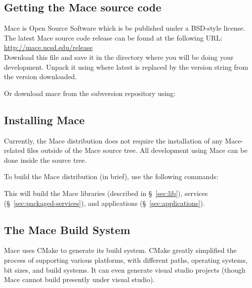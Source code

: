 \subsection{Getting the Mace source code}
\label{sec:downloading}

Mace is Open Source Software which is be published under a BSD-style license.
The latest Mace source code release can be found at the following URL: \\

\href{http://mace.ucsd.edu/release}{http://mace.ucsd.edu/release} \\

Download this file and save it in the directory where you will be
doing your development.  Unpack it using 
where  latest is replaced by the version string
from the version downloaded.

Or download mace from the subversion repository using: \\


\subsection{Installing Mace}
\label{sec:unpacking}

Currently, the Mace distribution does not require the installation of any
Mace-related files outside of the Mace source tree.  All development using Mace
can be done inside the source tree.

To build the Mace distribution (in brief), use the following commands:

\begin{screen}
\end{screen}

This will build the Mace libraries (described in
\S~\ref{sec:lib}), services
(\S~\ref{sec:packaged-services}), and applications
(\S~\ref{sec:applications}).

\subsection{The Mace Build System}
\label{sec:cmake}

Mace uses CMake to generate its build system.  CMake greatly simplified
the process of supporting various platforms, with different paths,
operating systems, bit sizes, and build systems.  It can even generate
visual studio projects (though Mace cannot build presently under visual
studio).  

